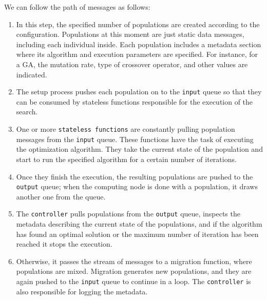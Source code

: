 We can follow the path of messages as follows:

\begin{enumerate}

\item In this step, the specified number of populations are created according
to the configuration. Populations at this moment are just static data messages,
including each individual inside. Each population includes a metadata section
where its algorithm and execution parameters are specified. For instance, for a
GA, the mutation rate, type of crossover operator, and other values are
indicated.

\item The setup process pushes each population on to the \texttt{input}
queue so that they can be consumed by stateless functions responsible for the
execution of the search.

\item One or more \texttt{stateless functions} are constantly pulling
population messages from the \texttt{input} queue. These functions have the
task of executing the optimization algorithm. They take the current state of
the population and start to run the specified algorithm for a certain number of
iterations.

\item Once they finish the execution, the resulting populations are pushed to
the \texttt{output} queue; when the computing node is done with a population, it draws another one from the
queue.

\item The \texttt{controller} pulls populations from the \texttt{output} queue,
inspects the metadata describing the current state of the populations, and if
the algorithm has found an optimal solution or the maximum number of iteration
has been reached it stops the execution.

\item Otherwise, it passes the stream of messages to a migration function,
where populations are mixed. Migration generates new populations, and they are
again pushed to the \texttt{input} queue to continue in a loop. The
\texttt{controller} is also responsible for logging the metadata.

\end{enumerate}

